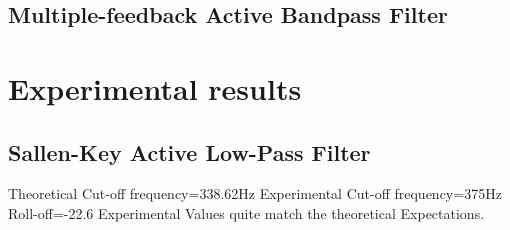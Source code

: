 \documentclass[12pt]{article}
\begin{document}
\subsection{Multiple-feedback Active Bandpass Filter}

\section{Experimental results}
\subsection{Sallen-Key Active Low-Pass Filter}
Theoretical Cut-off frequency=338.62Hz
Experimental Cut-off frequency=375Hz
Roll-off=-22.6
Experimental Values quite match the theoretical Expectations.
\end{document}

